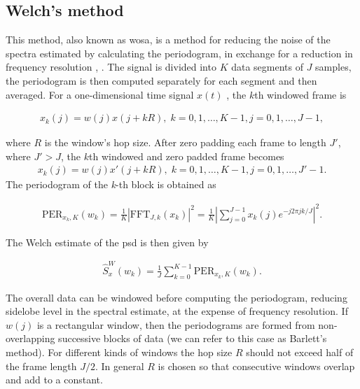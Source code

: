 	
	
	
	\subsection{Welch's method}
	
	This method, also known as \gls{wosa}, is a method for reducing the noise of the spectra estimated by calculating the periodogram, in exchange for a reduction in frequency resolution \cite{Welch_period}, \cite{Spagnolini_ch14}.
	The signal is divided into $K$ data segments of $J$ samples, the periodogram is then computed separately for each segment and then averaged.
	For a one-dimensional time signal $x(t)$ \cite{SASPWEB2011}, the $k$th windowed frame is
	
	\begin{align}
		x_k(j) = w(j)x(j + kR), \; k=0,1,\ldots, K-1, j=0,1,\ldots, J-1,
	\end{align}
	
	where $R$ is the window's hop size.
	After zero padding each frame to length $J'$, where $J' > J$, the $k$th windowed and zero padded frame becomes
		\begin{align}
		x_k(j) = w(j)x'(j + kR), \; k=0,1,\ldots, K-1, j=0,1,\ldots, J'-1.
	\end{align}
	The periodogram of the \textit{k}-th block is obtained as
	
	\begin{align}
		\text{PER}_{x_k,K}(w_k) = \frac{1}{K} |\text{FFT}_{J,k}(x_k)|^2 = \frac{1}{K}\left|\sum_{j=0}^{J-1}x_k(j)e^{-j2\pi jk/J}\right|^2.
	\end{align}
	
	The Welch estimate of the \gls{psd} is then given by
	
	\begin{align}
		\hat{S}^W_x(w_k) = \frac{1}{J}\sum_{k=0}^{K-1}\text{PER}_{x_k,K}(w_k).
	\end{align}
	
	The overall data can be windowed before computing the periodogram, reducing sidelobe level in the spectral estimate, at the expense of frequency resolution. If $w(j)$ is a rectangular window, then the periodograms are formed from non-overlapping successive blocks of data (we can refer to this case as Barlett's method). For different kinds of windows the hop size $R$ should not exceed half of the frame length $J/2$. In general $R$ is chosen so that consecutive windows overlap and add to a constant.
	
	
	

	

    
    
    
